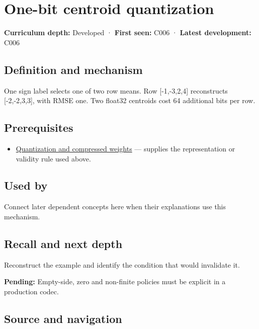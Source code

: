 \hypertarget{appendix-4ccd7a775813}{}\label{referencestart:appendix-4ccd7a775813}
\section{One-bit centroid quantization}\label{appendix-4ccd7a775813-one-bit-centroid-quantization}

\textbf{Curriculum depth:} Developed · \textbf{First seen:} C006 · \textbf{Latest development:} C006

\subsection{Definition and mechanism}\label{appendix-4ccd7a775813-definition-and-mechanism}

One sign label selects one of two row means. Row {[}-1,-3,2,4{]} reconstructs {[}-2,-2,3,3{]}, with RMSE one. Two float32 centroids cost 64 additional bits per row.

\subsection{Prerequisites}\label{appendix-4ccd7a775813-prerequisites}

\begin{itemize}
\tightlist
\item
  \hyperref[appendix-fdc7879e8bf2]{Quantization and compressed weights} --- supplies the representation or validity rule used above.
\end{itemize}

\subsection{Used by}\label{appendix-4ccd7a775813-used-by}

Connect later dependent concepts here when their explanations use this mechanism.

\subsection{Recall and next depth}\label{appendix-4ccd7a775813-recall-and-next-depth}

Reconstruct the example and identify the condition that would invalidate it.

\textbf{Pending:} Empty-side, zero and non-finite policies must be explicit in a production codec.

\subsection{Source and navigation}\label{appendix-4ccd7a775813-source-and-navigation}

